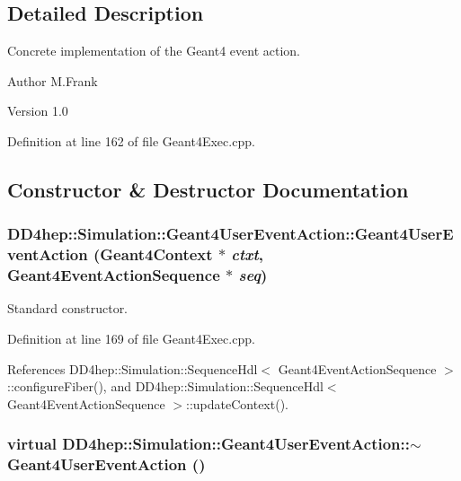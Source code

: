 \subsection{Detailed Description}
Concrete implementation of the Geant4 event action. \begin{DoxyAuthor}{Author}
M.Frank 
\end{DoxyAuthor}
\begin{DoxyVersion}{Version}
1.0 
\end{DoxyVersion}


Definition at line 162 of file Geant4Exec.cpp.

\subsection{Constructor \& Destructor Documentation}
\hypertarget{class_d_d4hep_1_1_simulation_1_1_geant4_user_event_action_a5d519de614318d3277d06587b93bde92}{
\subsubsection[{Geant4UserEventAction}]{\setlength{\rightskip}{0pt plus 5cm}DD4hep::Simulation::Geant4UserEventAction::Geant4UserEventAction ({\bf Geant4Context} $\ast$ {\em ctxt}, \/  {\bf Geant4EventActionSequence} $\ast$ {\em seq})}}
\label{class_d_d4hep_1_1_simulation_1_1_geant4_user_event_action_a5d519de614318d3277d06587b93bde92}


Standard constructor. 

Definition at line 169 of file Geant4Exec.cpp.

References DD4hep::Simulation::SequenceHdl$<$ Geant4EventActionSequence $>$::configureFiber(), and DD4hep::Simulation::SequenceHdl$<$ Geant4EventActionSequence $>$::updateContext().\hypertarget{class_d_d4hep_1_1_simulation_1_1_geant4_user_event_action_ac79b641d26fd4e4cbecc99460baf4d4f}{
\subsubsection[{$\sim$Geant4UserEventAction}]{\setlength{\rightskip}{0pt plus 5cm}virtual DD4hep::Simulation::Geant4UserEventAction::$\sim$Geant4UserEventAction ()}}
\label{class_d_d4hep_1_1_simulation_1_1_geant4_user_event_action_ac79b641d26fd4e4cbecc99460baf4d4f}


